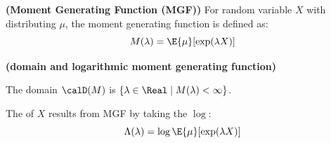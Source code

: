 \documentclass{article}
\newcommand{\bfs}[1]{\textbf{({#1})}}
\begin{document}
\begin{defa}{\bfs{Moment Generating Function (MGF)}} For random variable $X$ with distributing $\mu$, the moment generating function is defined as:
$$M(\lambda)=\E{\mu}[\exp(\lambda X)]$$
\end{defa}

\begin{rema}{\bfs{domain and logarithmic moment generating function}} \quad

The domain $\calD(M)$ is $\{\lambda\in \Real \mid M(\lambda) <\infty\}$.

The  of $X$ results from MGF by taking the $\log$:
$$\Lambda(\lambda)=\log \E{\mu}[\exp(\lambda X)]$$
\end{rema}
\end{document}
